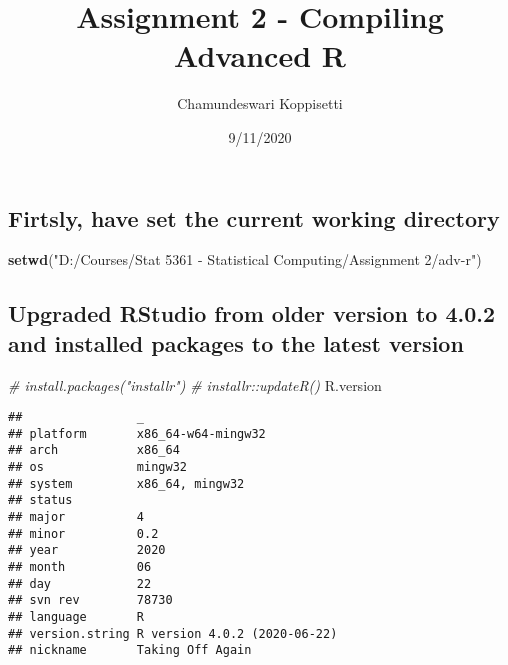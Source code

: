 \documentclass[
]{article}
\title{Assignment 2 - Compiling Advanced R}
\author{Chamundeswari Koppisetti}
\date{9/11/2020}
\newenvironment{Shaded}{\begin{snugshade}}{\end{snugshade}}
\newcommand{\CommentTok}[1]{\textcolor[rgb]{0.56,0.35,0.01}{\textit{#1}}}
\newcommand{\KeywordTok}[1]{\textcolor[rgb]{0.13,0.29,0.53}{\textbf{#1}}}
\newcommand{\NormalTok}[1]{#1}
\newcommand{\StringTok}[1]{\textcolor[rgb]{0.31,0.60,0.02}{#1}}
\begin{document}
\maketitle

\hypertarget{firtsly-have-set-the-current-working-directory}{%
\subsection{Firtsly, have set the current working
directory}\label{firtsly-have-set-the-current-working-directory}}

\begin{Shaded}
\begin{Highlighting}[]
\KeywordTok{setwd}\NormalTok{(}\StringTok{"D:/Courses/Stat 5361 - Statistical Computing/Assignment 2/adv-r"}\NormalTok{)}
\end{Highlighting}
\end{Shaded}

\hypertarget{upgraded-rstudio-from-older-version-to-4.0.2-and-installed-packages-to-the-latest-version}{%
\subsection{Upgraded RStudio from older version to 4.0.2 and installed
packages to the latest
version}\label{upgraded-rstudio-from-older-version-to-4.0.2-and-installed-packages-to-the-latest-version}}

\begin{Shaded}
\begin{Highlighting}[]
\CommentTok{# install.packages("installr")}
\CommentTok{# installr::updateR()}
\NormalTok{R.version}
\end{Highlighting}
\end{Shaded}

\begin{verbatim}
##                _                           
## platform       x86_64-w64-mingw32          
## arch           x86_64                      
## os             mingw32                     
## system         x86_64, mingw32             
## status                                     
## major          4                           
## minor          0.2                         
## year           2020                        
## month          06                          
## day            22                          
## svn rev        78730                       
## language       R                           
## version.string R version 4.0.2 (2020-06-22)
## nickname       Taking Off Again
\end{verbatim}
\end{document}
